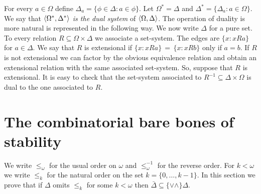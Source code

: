 \documentclass[creche.tex]{subfiles}
\begin{document}
For every $a\in\Omega$ define $\Delta_a=\big\{\phi\in\Delta: a\in\phi\big\}$. Let $\Omega^*=\Delta$ and $\Delta^*=\big\{\Delta_a: a\in\Omega\big\}$. We say that \emph{$\langle\Omega^*,\Delta^*\rangle$ is the dual system\/} of $\langle\Omega,\Delta\rangle$. The operation of duality is more natural is represented in the following way. We now write $\Delta$ for a pure set. To every relation $R\subseteq\Omega\times\Delta$ we associate a set-system. The edges are $\big\{x: xRa\big\}$ for $a\in\Delta$. We say that $R$ is extensional if $\big\{x: xRa\big\}\,=\,\big\{x: xRb\big\}$ only if $a=b$. If $R$ is not extensional we can factor by the obvious equivalence relation and obtain an extensional relation with the same associated set-system. So, suppose that $R$ is extensional. It is easy to check that the set-system associated to $R^{-1}\subseteq\Delta\times\Omega$ is dual to the one associated to $R$.



\section{The combinatorial bare bones of stability}\label{stability}

We write \emph{$\le_\omega$\/} for the usual order on $\omega$ and \emph{$\le^{\scriptscriptstyle -1}_\omega$\/} for the reverse order. For $k<\omega$ we write \emph{$\le_k$\/} for the natural order on the set $k=\big\{0,\dots,k-1\big\}$. In this section we prove that if $\Delta$ omits $\le_k$ for some $k<\omega$ then $\bar\Delta\subseteq\{\vee\wedge\}\Delta$.
\end{document}
